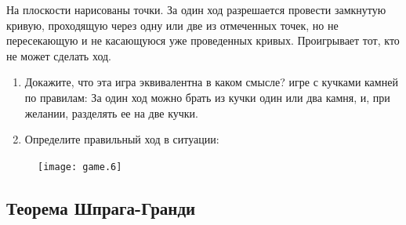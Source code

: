 \begin{problem}[Rayles]\label{Z:Rayles}
На плоскости нарисованы точки. За один ход разрешается провести замкнутую кривую, проходящую через одну или две из отмеченных точек, но не пересекающую и не касающуюся уже проведенных кривых. Проигрывает тот, кто не может сделать ход.\par
\begin{enumerate}
\item 	Докажите, что эта игра эквивалентна {\red в каком смысле?} игре с кучками камней по правилам: За один ход можно брать из кучки один или два камня, и, при желании, разделять ее на две кучки.\par
\item 	Определите правильный ход в ситуации:\par
\end{enumerate}
\begin{figure}[htbp]
     \texttt{[image: game.6]}
\end{figure}



\begin{sol}

\end{sol}
\end{problem}



\subsection{Теорема Шпрага-Гранди}

